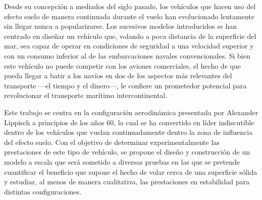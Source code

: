 
Desde su concepción a mediados del siglo pasado, los vehículos que hacen uso del efecto suelo de manera continuada durante el vuelo han evolucionado lentamente sin llegar nunca a popularizarse. Los sucesivos modelos introducidos se han centrado en diseñar un vehículo que, volando a poca distancia de la superficie del mar, sea capaz de operar en condiciones de seguridad a una velocidad superior y con un consumo inferior al de las embarcaciones navales convencionales. Si bien este vehículo no puede competir con los aviones comerciales, el hecho de que pueda llegar a batir a los navíos en dos de los aspectos más relevantes del transporte —el tiempo y el dinero—, le confiere un prometedor potencial para revolucionar el transporte marítimo intercontinental.

Este trabajo se  centra en la configuración aerodinámica presentada por Alexander Lippisch a principios de los años 60, la cual se ha convertido en líder indiscutible dentro de los vehículos que vuelan continuadamente dentro la zona de influencia del efecto suelo. Con el objetivo de determinar experimentalmente las prestaciones de este tipo de vehículo, se propone el diseño y construcción de un modelo a escala que será sometido a diversas pruebas en las que se pretende cuantificar el beneficio que supone el hecho de volar cerca de una superficie sólida y estudiar, al menos de manera cualitativa, las prestaciones en estabilidad para distintas configuraciones.